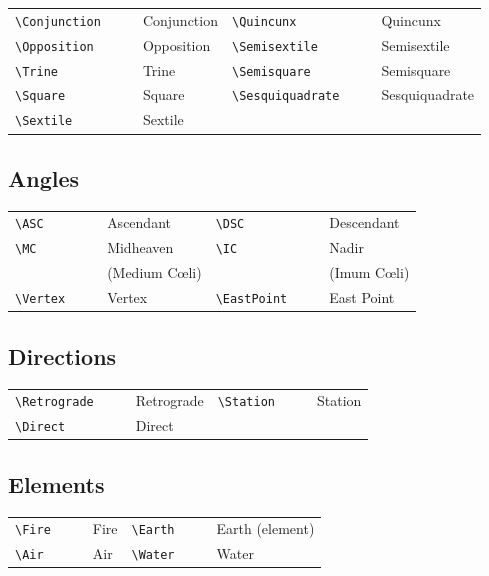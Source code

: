 \documentclass{article}
\newcommand{\showboth}[1]{\starfontsans #1 & \starfontserif #1}
\begin{document}
\begin{tabular}{llll|llll}
\verb|\Conjunction| & \showboth{\Conjunction} & Conjunction &
   \verb|\Quincunx| & \showboth{\Quincunx} & Quincunx \\
\verb|\Opposition| & \showboth{\Opposition} & Opposition &
   \verb|\Semisextile| & \showboth{\Semisextile} & Semisextile \\
\verb|\Trine| & \showboth{\Trine} & Trine &
   \verb|\Semisquare| & \showboth{\Semisquare} & Semisquare \\
\verb|\Square| & \showboth{\Square} & Square &
   \verb|\Sesquiquadrate| & \showboth{\Sesquiquadrate} & Sesquiquadrate \\
\verb|\Sextile| & \showboth{\Sextile} & Sextile
\end{tabular}

\subsection{Angles}

\begin{tabular}{llll|llll}
\verb|\ASC| & \showboth{\ASC} & Ascendant &
   \verb|\DSC| & \showboth{\DSC} & Descendant \\
\verb|\MC| & \showboth{\MC} & Midheaven &
   \verb|\IC| & \showboth{\IC} & Nadir \\
 & & & (Medium C\oe li) & & & & (Imum C\oe li) \\
\verb|\Vertex| & \showboth{\Vertex} & Vertex &
   \verb|\EastPoint| & \showboth{\EastPoint} & East Point
\end{tabular}

\subsection{Directions}

\begin{tabular}{llll|llll}
\verb|\Retrograde| & \showboth{\Retrograde} & Retrograde &
   \verb|\Station| & \showboth{\Station} & Station \\
\verb|\Direct| & \showboth{\Direct} & Direct
\end{tabular}

\subsection{Elements}

\begin{tabular}{llll|llll}
\verb|\Fire| & \showboth{\Fire} & Fire &
   \verb|\Earth| & \showboth{\Earth} & Earth (element) \\
\verb|\Air| & \showboth{\Air} & Air &
   \verb|\Water| & \showboth{\Water} & Water
\end{tabular}
\end{document}
